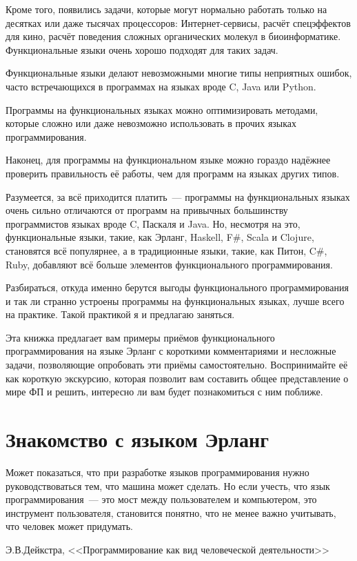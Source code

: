 \documentclass[
  paper=a4,
  fontsize=14pt,
  openany,
  appendixprefix=true
]{scrbook}
\begin{document}
Кроме того, появились задачи, которые могут нормально работать только на десятках или даже тысячах процессоров: Интернет-сервисы, расчёт спецэффектов для кино, расчёт поведения сложных органических молекул в биоинформатике. Функциональные языки очень хорошо подходят для таких задач.

Функциональные языки делают невозможными многие типы неприятных ошибок, часто встречающихся в программах на языках вроде C, Java или Python.

Программы на функциональных языках можно оптимизировать методами, которые сложно или даже невозможно использовать в прочих языках программирования.

Наконец, для программы на функциональном языке можно гораздо надёжнее проверить правильность её работы, чем для программ на языках других типов.

Разумеется, за всё приходится платить~--- программы на функциональных языках очень сильно отличаются от программ на привычных большинству программистов языках вроде C, Паскаля и Java. Но, несмотря на это, функциональные языки, такие, как Эрланг, Haskell, F\#, Scala и Clojure, становятся всё популярнее, а в традиционные языки, такие, как Питон, C\#, Ruby, добавляют всё больше элементов функционального программирования.

Разбираться, откуда именно берутся выгоды функционального программирования и так ли странно устроены программы на функциональных языках, лучше всего на практике. Такой практикой я и предлагаю заняться.

Эта книжка предлагает вам примеры приёмов функционального программирования на языке Эрланг с короткими комментариями и несложные задачи, позволяющие опробовать эти приёмы самостоятельно. Воспринимайте её как короткую экскурсию, которая позволит вам составить общее представление о мире ФП и решить, интересно ли вам будет познакомиться с ним поближе.

\chapter{Знакомство с языком Эрланг}

\epigraph{Может показаться, что при разработке языков программирования нужно руководствоваться тем, что машина может сделать. Но если учесть, что язык программирования~--- это мост между пользователем и компьютером, это инструмент пользователя, становится понятно, что не менее важно учитывать, что человек может придумать.}{Э.В.Дейкстра, <<Программирование как вид человеческой деятельности>>}
\end{document}
